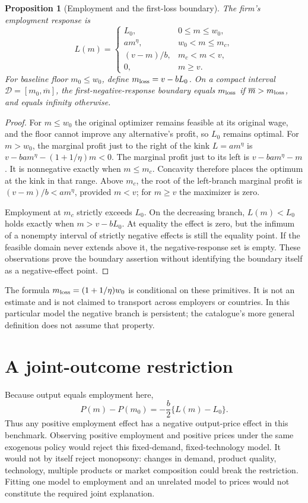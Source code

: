 \documentclass[11pt]{article}
\newtheorem{proposition}{Proposition}
\begin{document}
\begin{proposition}[Employment and the first-loss boundary]
The firm's employment response is
\[
 L(m)=\begin{cases}
 L_0,&0\leq m\leq w_0,\\
 a m^\eta,&w_0<m\leq m_c,\\
 (v-m)/b,&m_c<m<v,\\
 0,&m\geq v.
 \end{cases}
\]
For baseline floor $m_0\leq w_0$, define $m_{\rm loss}=v-bL_0$. On a compact interval $\mathcal D=[m_0,\overline m]$, the first-negative-response boundary equals $m_{\rm loss}$ if $\overline m>m_{\rm loss}$, and equals infinity otherwise.
\end{proposition}
\begin{proof}
For $m\leq w_0$ the original optimizer remains feasible at its original wage, and the floor cannot improve any alternative's profit, so $L_0$ remains optimal. For $m>w_0$, the marginal profit just to the right of the kink $L=a m^\eta$ is
$v-ba m^\eta-(1+1/\eta)m<0$.
The marginal profit just to its left is $v-ba m^\eta-m$. It is nonnegative exactly when $m\leq m_c$. Concavity therefore places the optimum at the kink in that range. Above $m_c$, the root of the left-branch marginal profit is $(v-m)/b<a m^\eta$, provided $m<v$; for $m\geq v$ the maximizer is zero.

Employment at $m_c$ strictly exceeds $L_0$. On the decreasing branch, $L(m)<L_0$ holds exactly when $m>v-bL_0$. At equality the effect is zero, but the infimum of a nonempty interval of strictly negative effects is still the equality point. If the feasible domain never extends above it, the negative-response set is empty. These observations prove the boundary assertion without identifying the boundary itself as a negative-effect point.
\end{proof}

The formula $m_{\rm loss}=(1+1/\eta)w_0$ is conditional on these primitives. It is not an estimate and is not claimed to transport across employers or countries. In this particular model the negative branch is persistent; the catalogue's more general definition does not assume that property.

\section*{A joint-outcome restriction}
Because output equals employment here,
\[
 P(m)-P(m_0)=-\frac b2\{L(m)-L_0\}.
\]
Thus any positive employment effect has a negative output-price effect in this benchmark. Observing positive employment and positive prices under the same exogenous policy would reject this fixed-demand, fixed-technology model. It would not by itself reject monopsony: changes in demand, product quality, technology, multiple products or market composition could break the restriction. Fitting one model to employment and an unrelated model to prices would not constitute the required joint explanation.
\end{document}

